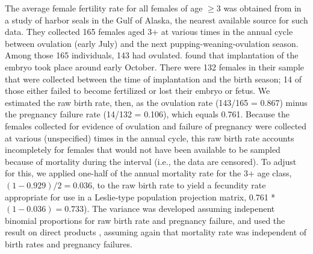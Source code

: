 \documentclass[12pt, titlepage]{article}\usepackage[]{graphicx}\usepackage[]{color}
\begin{document}
The average female fertility rate for all females of age $\ge 3$ was obtained from \citet{Pitc:Calk:biol:1979} in a study of harbor seals in the Gulf of Alaska, the nearest available source for such data. They collected 165 females aged 3+ at various times in the annual cycle between ovulation (early July) and the next pupping-weaning-ovulation season. Among those 165 individuals, 143 had ovulated. \citet{Pitc:Calk:biol:1979} found that implantation of the embryo took place around early October. There were 132 females in their sample that were collected between the time of implantation and the birth season; 14 of those either failed to become fertilized or lost their embryo or fetus. We estimated the raw birth rate, then, as the ovulation rate (143/165 = 0.867) minus the pregnancy failure rate (14/132 = 0.106), which equals 0.761. Because the females collected for evidence of ovulation and failure of pregnancy were collected at various (unspecified) times in the annual cycle, this raw birth rate accounts incompletely for females that would not have been available to be sampled because of mortality during the interval (i.e., the data are censored). To adjust for this, we applied one-half of the annual mortality rate for the 3+ age class, $(1 - 0.929) / 2 = 0.036$, to the raw birth rate to yield a fecundity rate appropriate for use in a Leslie-type population projection matrix, 0.761 * $(1-0.036) = 0.733$).  The variance was developed assuming indepenent binomial proportions for raw birth rate and pregnancy failure, and used the result on direct products \citep{Good:on:1960}, assuming again that mortality rate was independent of birth rates and pregnancy failures. 
\end{document}
